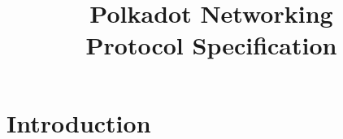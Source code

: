 \documentclass{book}
\begin{document}
\title{
    {\Huge Polkadot Networking}\\
    {\Large Protocol Specification}
}

\date{}
\maketitle
\tableofcontents

\chapter{Introduction}
    
\end{document}
